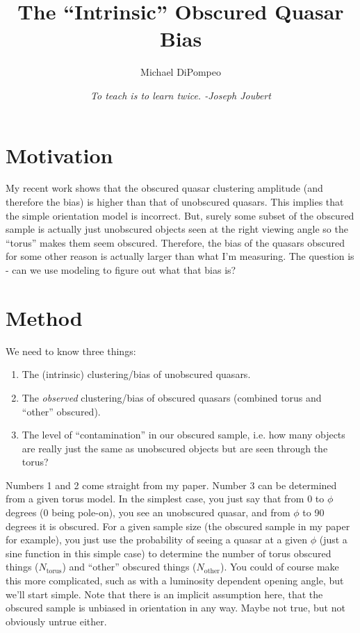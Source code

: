 \documentclass[11pt]{article}
\title{The ``Intrinsic'' Obscured Quasar Bias}
\author{Michael DiPompeo}
\date{\textit{To teach is to learn twice.  -Joseph Joubert}}
\begin{document}
   \maketitle%


\section*{Motivation}
\noindent My recent work shows that the obscured quasar clustering amplitude (and therefore the bias) is higher than that of unobscured quasars.  This implies that the simple orientation model is incorrect.  But, surely some subset of the obscured sample is actually just unobscured objects seen at the right viewing angle so the ``torus'' makes them seem obscured.  Therefore, the bias of the quasars obscured for some other reason is actually larger than what I'm measuring.  The question is - can we use modeling to figure out what that bias is? 

\section*{Method}
\noindent We need to know three things:
\begin{enumerate}
\item The (intrinsic) clustering/bias of unobscured quasars. 
\item The \textit{observed} clustering/bias of obscured quasars (combined torus and ``other'' obscured).
\item The level of ``contamination'' in our obscured sample, i.e. how many objects are really just the same as unobscured objects but are seen through the torus?
\end{enumerate}
Numbers 1 and 2 come straight from my paper.  Number 3 can be determined from a given torus model.  In the simplest case, you just say that from 0 to $\phi$ degrees (0 being pole-on), you see an unobscured quasar, and from $\phi$ to 90 degrees it is obscured.  For a given sample size (the obscured sample in my paper for example), you just use the probability of seeing a quasar at a given $\phi$ (just a sine function in this simple case) to determine the number of torus obscured things ($N_{\textrm{torus}}$) and ``other'' obscured things ($N_{\textrm{other}}$).  You could of course make this more complicated, such as with a luminosity dependent opening angle, but we'll start simple.  Note that there is an implicit assumption here, that the obscured sample is unbiased in orientation in any way.  Maybe not true, but not obviously untrue either.
\end{document}
